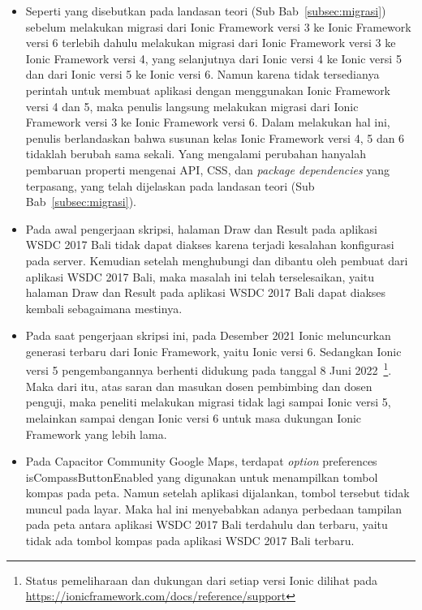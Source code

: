 \begin{itemize}
	\item Seperti yang disebutkan pada landasan teori (Sub Bab~\ref{subsec:migrasi}) sebelum melakukan migrasi dari Ionic Framework versi 3 ke Ionic Framework versi 6 terlebih dahulu melakukan migrasi dari Ionic Framework versi 3 ke Ionic Framework versi 4, yang selanjutnya dari Ionic versi 4 ke Ionic versi 5 dan dari Ionic versi 5 ke Ionic versi 6. Namun karena tidak tersedianya perintah untuk membuat aplikasi dengan menggunakan Ionic Framework versi 4 dan 5, maka penulis langsung melakukan migrasi dari Ionic Framework versi 3 ke Ionic Framework versi 6. Dalam melakukan hal ini, penulis berlandaskan bahwa susunan kelas Ionic Framework versi 4, 5 dan 6 tidaklah berubah sama sekali. Yang mengalami perubahan hanyalah pembaruan properti mengenai API, CSS, dan {\it package dependencies} yang terpasang, yang telah dijelaskan pada landasan teori (Sub Bab~\ref{subsec:migrasi}).
	
	\item Pada awal pengerjaan skripsi, halaman Draw dan Result pada aplikasi WSDC 2017 Bali tidak dapat diakses karena terjadi kesalahan konfigurasi pada server. Kemudian setelah menghubungi dan dibantu oleh pembuat dari aplikasi WSDC 2017 Bali, maka masalah ini telah terselesaikan, yaitu halaman Draw dan Result pada aplikasi WSDC 2017 Bali dapat diakses kembali sebagaimana mestinya.
	
	\item Pada saat pengerjaan skripsi ini, pada Desember 2021 Ionic meluncurkan generasi terbaru dari Ionic Framework, yaitu Ionic versi 6. Sedangkan Ionic versi 5 pengembangannya berhenti didukung pada tanggal 8 Juni 2022~\footnote{Status pemeliharaan dan dukungan dari setiap versi Ionic dilihat pada \url{https://ionicframework.com/docs/reference/support}}. Maka dari itu, atas saran dan masukan dosen pembimbing dan dosen penguji, maka peneliti melakukan migrasi tidak lagi sampai Ionic versi 5, melainkan sampai dengan Ionic versi 6 untuk masa dukungan Ionic Framework yang lebih lama.
	
	\item Pada Capacitor Community Google Maps, terdapat \textit{option} preferences isCompassButtonEnabled yang digunakan untuk menampilkan tombol kompas pada peta. Namun setelah aplikasi dijalankan, tombol tersebut tidak muncul pada layar. Maka hal ini menyebabkan adanya perbedaan tampilan pada peta antara aplikasi WSDC 2017 Bali terdahulu dan terbaru, yaitu tidak ada tombol kompas pada aplikasi WSDC 2017 Bali terbaru.
	
\end{itemize}